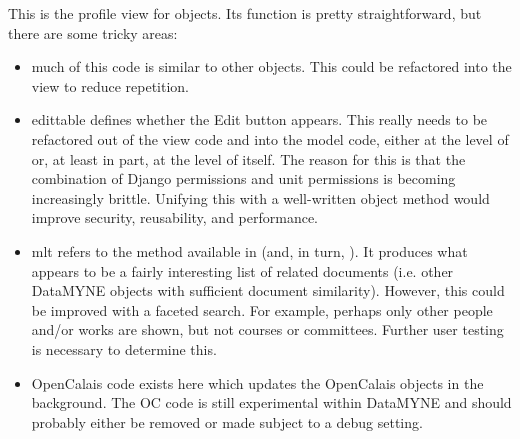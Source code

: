 \documentclass[letterpaper,10pt,english]{sphinxmanual}
\begin{document}
\begin{fulllineitems}
\label{generated/apps.profiles.views:apps.profiles.views.view_staff_profile}
This is the profile view for  objects.  Its function is pretty
straightforward, but there are some tricky areas:
\begin{itemize}
\item {} 
much of this code is similar to other  objects.  This could be
refactored into the  view to reduce repetition.

\item {} 
edittable defines whether the Edit button appears.  This really needs
to be refactored out of the view code and into the model code, either
at the level of  or, at least in part, at the level of
 itself.  The reason for this is that the combination of 
Django permissions and unit permissions is becoming increasingly brittle.
Unifying this with a well-written object method would improve security,
reusability, and performance.

\item {} 
mlt refers to the  method available in  
(and, in turn, ).  It produces what appears to be a fairly interesting
list of related documents (i.e. other DataMYNE objects with sufficient
document similarity).  However, this could be improved with a faceted search.
For example, perhaps only other people and/or works are shown, but not courses
or committees.  Further user testing is necessary to determine this.

\item {} 
OpenCalais code exists here which updates the OpenCalais objects in
the background.  The OC code is still experimental within DataMYNE and
should probably either be removed or made subject to a debug setting.

\end{itemize}

\end{fulllineitems}


\end{document}
